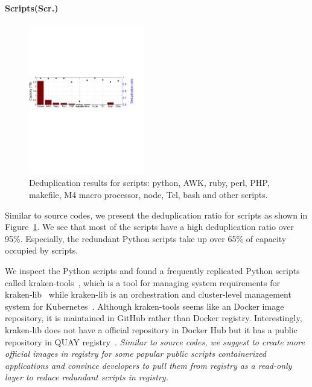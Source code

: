 \paragraph{Scripts(Scr.)}
%
%

\begin{figure} \centering
\includegraphics[width=0.45\textwidth]{graphs/dedup-scrp}
\caption{Deduplication results for scripts: python, AWK, ruby, perl, PHP,
makefile, M4 macro processor, node, Tcl, bash and other scripts.  }
\label{fig:dedup-scrp} \end{figure}

Similar to source codes, we present the deduplication ratio for scripts as
shown in Figure~\ref{fig:dedup-scrp}.  We see that most of the scripts have a
high deduplication ratio over 95\%. Especially, the redundant Python scripts
take up over 65\% of capacity occupied by scripts. 

We inspect the Python scripts and found a frequently replicated Python scripts
called kraken-tools~\cite{xxx}, which is a tool for managing system
requirements for kraken-lib~\cite{xxx} while kraken-lib is an orchestration and
cluster-level management system for Kubernetes~\cite{xxx}.
Although kraken-tools seems like an Docker image repository, it is maintained
in GitHub rather than Docker registry. Interestingly, kraken-lib does not have
a official repository in Docker Hub but it has a public repository in QUAY
registry~\cite{xxx}.  \textit{Similar to source codes, we suggest to create
more official images in registry for some popular public scripts %
containerized applications and convince developers to pull them from registry
as a read-only layer to reduce redundant scripts in registry.}

